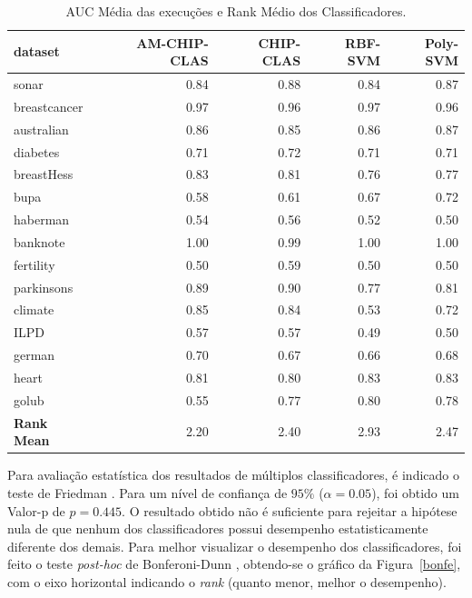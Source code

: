 \documentclass[
	12pt,				%
	openright,			%
	twoside,			%
	a4paper,			%
	english,			%
	spanish,			%
	brazil,				%
	]{abntex2}\usepackage[]{graphicx}\usepackage[]{color}
\begin{document}
\begin{table}[ht]
\centering
\caption{AUC Média das execuções e Rank Médio dos Classificadores.} 
\label{tabauc}
\begin{tabular}{lrrrr}
  \hline
dataset & AM-CHIP-CLAS & CHIP-CLAS & RBF-SVM & Poly-SVM \\ 
  \hline
sonar & 0.84 & 0.88 & 0.84 & 0.87 \\ 
  breastcancer & 0.97 & 0.96 & 0.97 & 0.96 \\ 
  australian & 0.86 & 0.85 & 0.86 & 0.87 \\ 
  diabetes & 0.71 & 0.72 & 0.71 & 0.71 \\ 
  breastHess & 0.83 & 0.81 & 0.76 & 0.77 \\ 
  bupa & 0.58 & 0.61 & 0.67 & 0.72 \\ 
  haberman & 0.54 & 0.56 & 0.52 & 0.50 \\ 
  banknote & 1.00 & 0.99 & 1.00 & 1.00 \\ 
  fertility & 0.50 & 0.59 & 0.50 & 0.50 \\ 
  parkinsons & 0.89 & 0.90 & 0.77 & 0.81 \\ 
  climate & 0.85 & 0.84 & 0.53 & 0.72 \\ 
  ILPD & 0.57 & 0.57 & 0.49 & 0.50 \\ 
  german & 0.70 & 0.67 & 0.66 & 0.68 \\ 
  heart & 0.81 & 0.80 & 0.83 & 0.83 \\ 
  golub & 0.55 & 0.77 & 0.80 & 0.78 \\ 
   \hline
\textbf{Rank Mean} & 2.20 & 2.40 & 2.93 & 2.47 \\ 
   \hline
\end{tabular}
\end{table}
\par Para avaliação estatística dos resultados de múltiplos classificadores, é indicado o teste de Friedman \cite{Demsar2006}. Para um nível de confiança de $95\%$ ($\alpha = 0.05$), foi obtido um Valor-p de $p = 0.445$. O resultado obtido não é suficiente para rejeitar a hipótese nula de que nenhum dos classificadores possui desempenho estatisticamente diferente dos demais. Para melhor visualizar o desempenho dos classificadores, foi feito o teste \textit{post-hoc} de Bonferoni-Dunn \cite{Demsar2006}, obtendo-se o gráfico da Figura~\ref{bonfe}, com o eixo horizontal indicando o \textit{rank} (quanto menor, melhor o desempenho).
\end{document}
